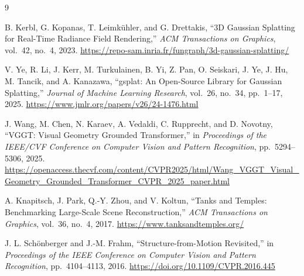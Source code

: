 \documentclass[11pt,a4paper]{article}
\begin{document}
\begin{thebibliography}{9}

B. Kerbl, G. Kopanas, T. Leimk\"uhler, and G. Drettakis,
``3D Gaussian Splatting for Real-Time Radiance Field Rendering,''
\emph{ACM Transactions on Graphics}, vol.~42, no.~4, 2023.
\url{https://repo-sam.inria.fr/fungraph/3d-gaussian-splatting/}

V. Ye, R. Li, J. Kerr, M. Turkulainen, B. Yi, Z. Pan, O. Seiskari,
J. Ye, J. Hu, M. Tancik, and A. Kanazawa,
``gsplat: An Open-Source Library for Gaussian Splatting,''
\emph{Journal of Machine Learning Research}, vol.~26, no.~34, pp.~1--17, 2025.
\url{https://www.jmlr.org/papers/v26/24-1476.html}

J. Wang, M. Chen, N. Karaev, A. Vedaldi, C. Rupprecht, and D. Novotny,
``VGGT: Visual Geometry Grounded Transformer,''
in \emph{Proceedings of the IEEE/CVF Conference on Computer Vision and Pattern Recognition},
pp.~5294--5306, 2025.
\url{https://openaccess.thecvf.com/content/CVPR2025/html/Wang_VGGT_Visual_Geometry_Grounded_Transformer_CVPR_2025_paper.html}

A. Knapitsch, J. Park, Q.-Y. Zhou, and V. Koltun,
``Tanks and Temples: Benchmarking Large-Scale Scene Reconstruction,''
\emph{ACM Transactions on Graphics}, vol.~36, no.~4, 2017.
\url{https://www.tanksandtemples.org/}

J. L. Sch\"onberger and J.-M. Frahm,
``Structure-from-Motion Revisited,''
in \emph{Proceedings of the IEEE Conference on Computer Vision and Pattern Recognition},
pp.~4104--4113, 2016.
\url{https://doi.org/10.1109/CVPR.2016.445}

\end{thebibliography}
\end{document}
